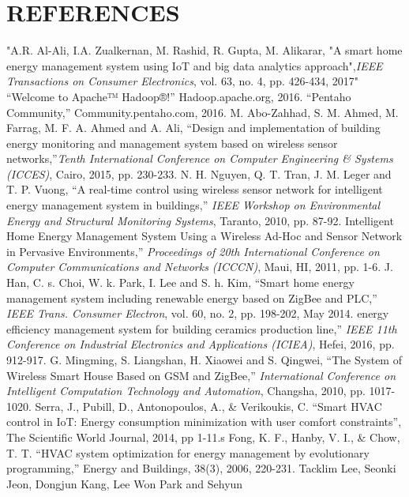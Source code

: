 \documentclass[a4paper,12pt,oneside]{article}
\begin{document}
\section{REFERENCES}
\begin{thebibliography}{9}

"A.R. Al-Ali, I.A. Zualkernan, M. Rashid, R. Gupta, M. Alikarar, "A smart home energy management system using IoT and big data analytics approach",\emph{IEEE Transactions on Consumer Electronics}, vol. 63, no. 4, pp. 426-434, 2017"
“Welcome to Apache™ Hadoop®!” Hadoop.apache.org, 2016.
“Pentaho Community,” Community.pentaho.com, 2016.
M. Abo-Zahhad, S. M. Ahmed, M. Farrag, M. F. A. Ahmed and A. Ali,
“Design and implementation of building energy monitoring and
management system based on wireless sensor networks,”\emph{Tenth
International Conference on Computer Engineering \& Systems (ICCES)},
Cairo, 2015, pp. 230-233.
N. H. Nguyen, Q. T. Tran, J. M. Leger and T. P. Vuong, “A real-time
control using wireless sensor network for intelligent energy management
system in buildings,” \emph{IEEE Workshop on Environmental Energy
and Structural Monitoring Systems}, Taranto, 2010, pp. 87-92.
Intelligent Home Energy Management System Using a Wireless Ad-Hoc
and Sensor Network in Pervasive Environments,” \emph{Proceedings of
20th International Conference on Computer Communications and
Networks (ICCCN)}, Maui, HI, 2011, pp. 1-6.
J. Han, C. s. Choi, W. k. Park, I. Lee and S. h. Kim, “Smart home energy
management system including renewable energy based on ZigBee and PLC,”
\emph{IEEE Trans. Consumer Electron}, vol. 60, no. 2, pp. 198-202, May 2014.
energy efficiency management system for building ceramics production
line,” \emph{IEEE 11th Conference on Industrial Electronics and
Applications (ICIEA)}, Hefei, 2016, pp. 912-917.
G. Mingming, S. Liangshan, H. Xiaowei and S. Qingwei, “The System
of Wireless Smart House Based on GSM and ZigBee,”\emph{
International Conference on Intelligent Computation Technology and
Automation}, Changsha, 2010, pp. 1017-1020.
Serra, J., Pubill, D., Antonopoulos, A., \& Verikoukis, C. “Smart HVAC
control in IoT: Energy consumption minimization with user comfort
constraints”, The Scientific World Journal, 2014, pp 1-11.s
Fong, K. F., Hanby, V. I., \& Chow, T. T. “HVAC system optimization
for energy management by evolutionary programming,” Energy and
Buildings, 38(3), 2006, 220-231.
Tacklim Lee, Seonki Jeon, Dongjun Kang, Lee Won Park and Sehyun

\end{thebibliography}
\end{document}
